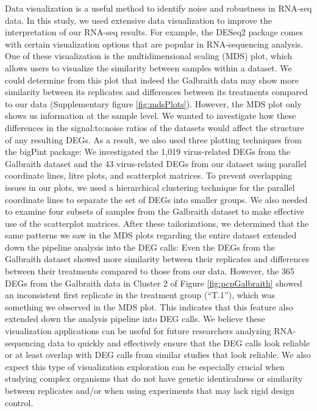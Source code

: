 \documentclass[11pt,a4paper,oldfontcommands,openany]{memoir}
\numberwithin{equation}{section} %
\begin{document}
Data visualization is a useful method to identify noise and robustness in RNA-seq data. In this study, we used extensive data visualization to improve the interpretation of our RNA-seq results. For example, the DESeq2 package comes with certain visualization options that are popular in RNA-sequencing analysis. One of these visualization is the multidimensional scaling (MDS) plot, which allows users to visualize the similarity between samples within a dataset. We could determine from this plot that indeed the Galbraith data may show more similarity between its replicates and differences between its treatments compared to our data (Supplementary figure \ref{fig:mdsPlots}). However, the MDS plot only shows us information at the sample level. We wanted to investigate how these differences in the signal:to:noise ratios of the datasets would affect the structure of any resulting DEGs. As a result, we also used three plotting techniques from the bigPint package: We investigated the 1,019 virus-related DEGs from the Galbraith dataset and the 43 virus-related DEGs from our dataset using parallel coordinate lines, litre plots, and scatterplot matrices. To prevent overlapping issues in our plots, we used a hierarchical clustering technique for the parallel coordinate lines to separate the set of DEGs into smaller groups. We also needed to examine four subsets of samples from the Galbraith dataset to make effective use of the scatterplot matrices. After these tailorizations, we determined that the same patterns we saw in the MDS plots regarding the entire dataset extended down the pipeline analysis into the DEG calls: Even the DEGs from the Galbraith dataset showed more similarity between their replicates and differences between their treatments compared to those from our data. However, the 365 DEGs from the Galbraith data in Cluster 2 of Figure \ref{fig:pcpGalbraith} showed an inconsistent first replicate in the treatment group (``T.1''), which was something we observed in the MDS plot. This indicates that this feature also extended down the analysis pipeline into DEG calls. We believe these visualization applications can be useful for future researchers analyzing RNA-sequencing data to quickly and effectively ensure that the DEG calls look reliable or at least overlap with DEG calls from similar studies that look reliable. We also expect this type of visualization exploration can be especially crucial when studying complex organisms that do not have genetic identicalness or similarity between replicates and/or when using experiments that may lack rigid design control.
\end{document}
